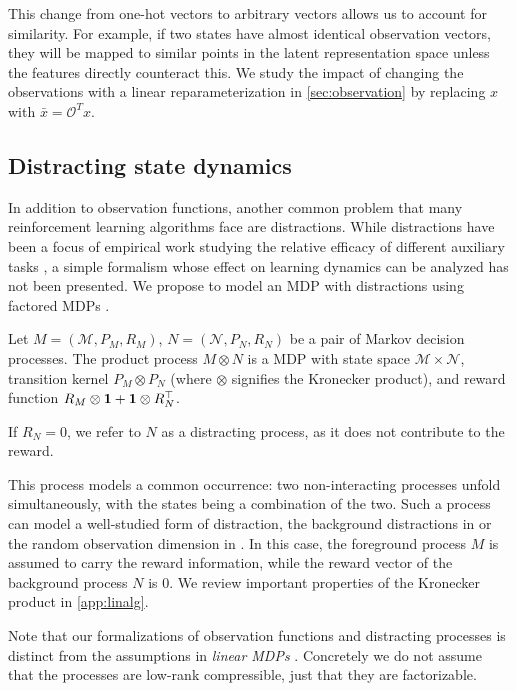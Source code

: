 This change from one-hot vectors to arbitrary vectors allows us to account for similarity.
For example, if two states have almost identical observation vectors, they will be mapped to similar points in the latent representation space unless the features directly counteract this.
We study the impact of changing the observations with a linear reparameterization in \autoref{sec:observation} by replacing $x$ with $\bar{x} = \mathcal{O}^T x$.

\subsection{Distracting state dynamics}
In addition to observation functions, another common problem that many reinforcement learning algorithms face are distractions.
While distractions have been a focus of empirical work studying the relative efficacy of different auxiliary tasks \parencite{ni2024bridging}, a simple formalism whose effect on learning dynamics can be analyzed has not been presented. 
We propose to model an MDP with distractions using factored MDPs \parencite{boutilier2000stochastic}.

\begin{definition}\label{def:distracting}
Let $M=(\mathcal{M}, P_{M},R_M)$,  $N=(\mathcal{N},P_N,R_N)$ be a pair of Markov decision processes.
The product process $M \otimes N$ is a MDP with state space $\mathcal{M}\times \mathcal{N}$, transition kernel $P_M\otimes P_N$ (where $\otimes$ signifies the Kronecker product), and reward function $R_M\otimes {\bm{1}} +{\bm{1}} \otimes R_N^\top$.

If $R_N = 0$, we refer to $N$ as a distracting process, as it does not contribute to the reward.
\end{definition}

This process models a common occurrence: two non-interacting processes unfold simultaneously, with the states being a combination of the two.
Such a process can model a well-studied form of distraction, the background distractions in  \cite{Stone2021TheDC} or the random observation dimension in \textcite{nikishin2021control,voelcker2022value}.
In this case, the foreground process $M$ is assumed to carry the reward information, while the reward vector of the background process $N$ is 0.
We review important properties of the Kronecker product in \autoref{app:linalg}.


Note that our formalizations of observation functions and distracting processes is distinct from the assumptions in \emph{linear MDPs} \parencite{jin2020provably}. Concretely we do not assume that the processes are low-rank compressible, just that they are factorizable.

